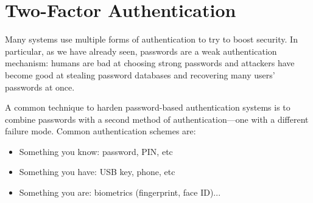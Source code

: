 \section{Two-Factor Authentication}

Many systems use multiple forms of authentication to try to boost security. 
In particular, as we have already seen, passwords are a weak authentication
mechanism: humans are bad at choosing strong passwords and 
attackers have become good at stealing password databases
and recovering many users' passwords at once.

A common technique to harden password-based authentication systems
is to combine passwords with a second method of 
authentication---one with a different failure mode. 
Common authentication schemes are:

\begin{itemize}
	\item Something you know: password, PIN, etc
	\item Something you have: USB key, phone, etc
	\item Something you are: biometrics (fingerprint, face ID)...
\end{itemize}


